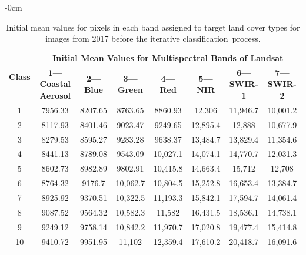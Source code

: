 \documentclass[jmse,article,accept,pdftex,oneauthor]{Definitions/mdpi}
\begin{document}
\begin{table}[H]
  \caption{Initial mean values for pixels in each band assigned to target land cover types for images from 2017 before the iterative classification~process.  \label{tabA3} }

\begin{adjustwidth}{-\extralength}{0cm}
\setlength{\tabcolsep}{3.6mm}
   \begin{tabular}{cccccccc}
  \toprule
  \multirow{2}{*}{\textbf{Class}} & \multicolumn{7}{c}{\textbf{Initial Mean Values for Multispectral Bands of Landsat}} \\
     & \textbf{1---Coastal Aerosol} & \textbf{2---Blue} & \textbf{3---Green} & \textbf{4---Red} & \textbf{5---NIR} & \textbf{6---SWIR-1} & \textbf{7---SWIR-2} \\
    \midrule %
    1 & 7956.33 & 8207.65 & 8763.65 & 8860.93 & 12,306 & 11,946.7 & 10,001.2 \\
    2 & 8117.93 & 8401.46 & 9023.47 & 9249.65 & 12,895.4 & 12,888 & 10,677.9 \\
    3 & 8279.53 & 8595.27 & 9283.28 & 9638.37 & 13,484.7 & 13,829.4 & 11,354.6 \\
    4 & 8441.13 & 8789.08 & 9543.09 & 10,027.1 & 14,074.1 & 14,770.7 & 12,031.3 \\
    5 & 8602.73 & 8982.89 & 9802.91 & 10,415.8 & 14,663.4 & 15,712 & 12,708 \\
    6 & 8764.32 & 9176.7 & 10,062.7 & 10,804.5 & 15,252.8 & 16,653.4 & 13,384.7 \\
    7 & 8925.92 & 9370.51 & 10,322.5 & 11,193.3 & 15,842.1 & 17,594.7 & 14,061.4 \\
    8 & 9087.52 & 9564.32 & 10,582.3 & 11,582 & 16,431.5 & 18,536.1 & 14,738.1 \\
    9 & 9249.12 & 9758.14 & 10,842.2 & 11,970.7 & 17,020.8 & 19,477.4 & 15,414.8 \\
    10 & 9410.72 & 9951.95 & 11,102 & 12,359.4 & 17,610.2 & 20,418.7 & 16,091.6 \\
\bottomrule
\end{tabular}
\end{adjustwidth}


\end{table}
\unskip 
\end{document}
